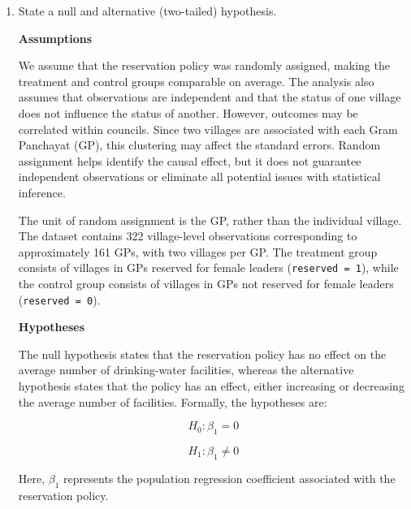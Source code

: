 \documentclass[12pt,letterpaper]{article}
\begin{document}
\newpage
\begin{enumerate}
	\item [(a)] State a null and alternative (two-tailed) hypothesis. 
	
	{\large \textbf{Assumptions}}
	
	We assume that the reservation policy was randomly assigned, making the treatment and control groups comparable on average. The analysis also assumes that observations are independent and that the status of one village does not influence the status of another. However, outcomes may be correlated within councils. Since two villages are associated with each Gram Panchayat (GP), this clustering may affect the standard errors. Random assignment helps identify the causal effect, but it does not guarantee independent observations or eliminate all potential issues with statistical inference.
	
	The unit of random assignment is the GP, rather than the individual village. The dataset contains 322 village-level observations corresponding to approximately 161 GPs, with two villages per GP. The treatment group consists of villages in GPs reserved for female leaders (\texttt{reserved = 1}), while the control group consists of villages in GPs not reserved for female leaders (\texttt{reserved = 0}).
	
	\vspace{0.3cm}
	
	{\large \textbf{Hypotheses}}
	
	The null hypothesis states that the reservation policy has no effect on the average number of drinking-water facilities, whereas the alternative hypothesis states that the policy has an effect, either increasing or decreasing the average number of facilities. Formally, the hypotheses are:
	
	\[
	H_0: \beta_1 = 0
	\]
	
	\[
	H_1: \beta_1 \neq 0
	\]
	
	Here, $\beta_1$ represents the population regression coefficient associated with the reservation policy.
	

\end{enumerate}
\end{document}
